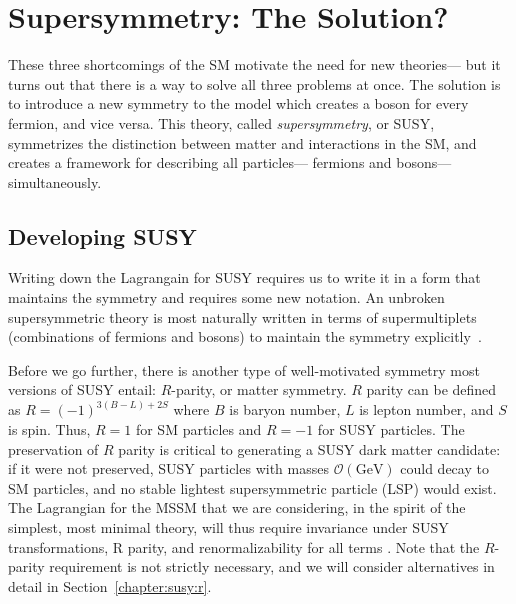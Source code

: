 \section{Supersymmetry: The Solution?}


These three shortcomings of the SM motivate the need for new theories--- but it turns out that there is a way to solve all three problems at once. The solution is to introduce a new symmetry to the model which creates a boson for every fermion, and vice versa. This theory, called \textit{supersymmetry}, or SUSY, symmetrizes the distinction between matter and interactions in the SM, and creates a framework for describing all particles--- fermions and bosons--- simultaneously.


\subsection{Developing SUSY} 

\label{chapter:susy:susy:developing}

Writing down the Lagrangain for SUSY requires us to write it in a form that maintains the symmetry and requires some new notation. An unbroken supersymmetric theory is most naturally written in terms of supermultiplets (combinations of fermions and bosons) to maintain the symmetry explicitly~\cite{Jungman}. 

Before we go further, there is another type of well-motivated symmetry most versions of SUSY entail: $R$-parity, or matter symmetry\cite{Jungman}. $R$ parity can be defined as $R = (-1)^{3(B-L)+2S}$ where $B$ is baryon number, $L$ is lepton number, and $S$ is spin. Thus, $R = 1$ for SM particles and $R = -1$ for SUSY particles. The preservation of $R$ parity is critical to generating a SUSY dark matter candidate: if it were not preserved, SUSY particles with masses $\mathcal{O}(\mathrm{GeV})$ could decay to SM particles, and no stable lightest supersymmetric particle (LSP) would exist. The Lagrangian for the MSSM that we are considering, in the spirit of the simplest, most minimal theory, will thus require invariance under SUSY transformations, R parity, and renormalizability for all terms \cite{Jungman}. Note that the $R$-parity requirement is not strictly necessary, and we will consider alternatives in detail in Section~\ref{chapter:susy:r}.


